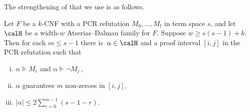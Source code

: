 The strengthening of  that we use is as follows.

\begin{lemma}\label{lem:main-bis}
Let $F$ be a $k$-CNF with a PCR refutation $M_0,\ldots,M_t$
in term space $s$,
and let $\calH$ be a width-$w$ Atserias--Dalmau family for $F$.
Suppose $w \ge s(s-1)+k$.
Then for each $m \le s-1$ there is~$\alpha \in \calH$ 
and a proof interval $[i,j]$ in the PCR refutation such that
\begin{enumerate}[(i)]
\item 
$\alpha \Vdash M_{i}$ and  $\alpha \Vdash \neg M_{j}$\,,
\item 
$\alpha$ guarantees $m$ non-zeroes in $[i,j]$,
\item 
$|\alpha| \le \displaystyle{2\sum_{r=0}^{m-1} (s - 1-r)}$.
\end{enumerate}
\end{lemma}

